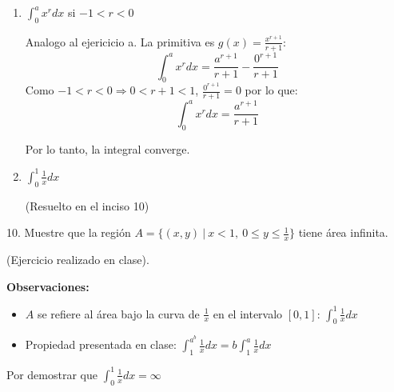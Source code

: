 \documentclass[12pt]{article}
\begin{document}
\begin{enumerate}[\hspace{9px} a)]
    \item \(\displaystyle\int_{0}^{a}x^rdx\) si $-1<r<0$\bigskip
        
        Analogo al ejericicio a. La primitiva es \(g(x)=\displaystyle\frac{x^{r+1}}{r+1}\):
        \begin{equation*}
            \int_{0}^{a}x^rdx = \frac{a^{r+1}}{r+1} - \frac{0^{r+1}}{r+1}
        \end{equation*}
        Como \(-1<r<0 \Rightarrow 0<r+1<1\), \(\displaystyle\frac{0^{r+1}}{r+1}=0\) por lo que:
        \begin{equation*}
            \int_{0}^{a}x^rdx = \frac{a^{r+1}}{r+1}
        \end{equation*}

        Por lo tanto, la integral converge.\bigskip

    \item \(\displaystyle\int_{0}^{1}\frac{1}{x}dx\)\medskip
    
    (Resuelto en el inciso 10)\bigskip

\end{enumerate}

10. Muestre que la regi\'on \(A=\{(x,y) \ | \ x<1, \ 0 \leq y \leq \frac{1}{x}\}\) tiene \'area infinita.\medskip

(Ejercicio realizado en clase).\bigskip

\textbf{Observaciones:}\medskip
\begin{itemize}
    \item $A$ se refiere al \'area bajo la curva de \(\displaystyle\frac{1}{x}\) en el intervalo $[0,1]$: \quad \(\displaystyle\int_0^1\frac{1}{x}dx\)
    \item Propiedad presentada en clase: \(\displaystyle\int_1^{\displaystyle a^b}\frac{1}{x}dx = b\int_1^a\frac{1}{x}dx\)\bigskip
\end{itemize}

Por demostrar que \(\displaystyle\int_0^1\frac{1}{x}dx = \infty\)
\end{document}
